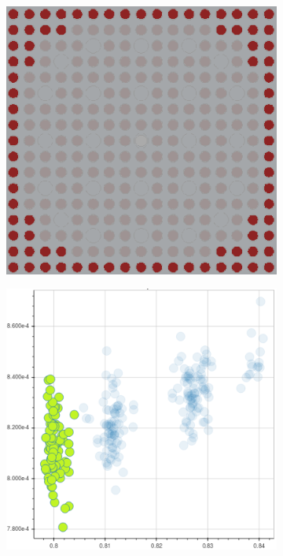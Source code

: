 \documentclass[12pt,twoside]{mitthesis-exec}
\begin{document}
\begin{figure}[h!]
\begin{subfigure}{0.45\textwidth}
  \caption{}
  \label{fig:capt-mean-std-mgxs}
\end{subfigure}
\begin{subfigure}{0.45\textwidth}
  \centering
  \includegraphics[width=0.9\linewidth]{figures/unsupervised/features/assm-16/u238-capt/mean-std/geometry-2}
  \caption{}
  \label{fig:capt-mean-std-geom-2}
\end{subfigure}%
\begin{subfigure}{0.45\textwidth}
  \centering
  \includegraphics[width=0.9\linewidth]{figures/unsupervised/features/assm-16/u238-capt/mean-std/mgxs-2}

\end{subfigure}
\end{figure}
\end{document}
